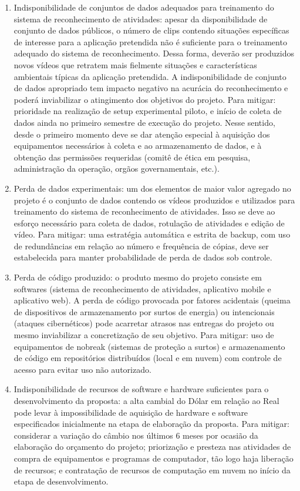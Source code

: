 \begin{enumerate}
	\item Indisponibilidade de conjuntos de dados adequados para treinamento do sistema de reconhecimento de atividades: apesar da disponibilidade de conjunto de dados públicos, o número de clips contendo situações específicas de interesse para a aplicação pretendida não é suficiente para o treinamento adequado do sistema de reconhecimento. Dessa forma, deverão ser produzidos novos vídeos que retratem mais fielmente situações e características ambientais típicas da aplicação pretendida. A indisponibilidade de conjunto de dados apropriado tem impacto negativo na acurácia do reconhecimento e poderá inviabilizar o atingimento dos objetivos do projeto. Para mitigar: prioridade na realização de setup experimental piloto, e início de coleta de dados ainda no primeiro semestre de execução do projeto. Nesse sentido, desde o primeiro momento deve se dar atenção especial à aquisição dos equipamentos necessários à coleta e ao armazenamento de dados, e à obtenção das permissões requeridas (comitê de ética em pesquisa, administração da operação, orgãos governamentais, etc.).
	\item Perda de dados experimentais: um dos elementos de maior valor agregado no projeto é o conjunto de dados contendo os vídeos produzidos e utilizados para treinamento do sistema de reconhecimento de atividades. Isso se deve ao esforço necessário para coleta de dados, rotulação de atividades e edição de vídeo. Para mitigar: uma estratégia automática e estrita de backup, com uso de redundâncias em relação ao número e frequência de cópias, deve ser estabelecida para manter probabilidade de perda de dados sob controle.
	\item Perda de código produzido: o produto mesmo do projeto consiste em softwares (sistema de reconhecimento de atividades, aplicativo mobile e aplicativo web). A perda de código provocada por fatores acidentais (queima de dispositivos de armazenamento por surtos de energia) ou intencionais (ataques cibernéticos) pode acarretar atrasos nas entregas do projeto ou mesmo inviabilizar a concretização de seu objetivo. Para mitigar: uso de equipamentos de nobreak (sistemas de proteção a surtos) e armazenamento de código em repositórios distribuídos (local e em nuvem) com controle de acesso para evitar uso não autorizado.
	\item Indisponibilidade de recursos de software e hardware suficientes para o desenvolvimento da proposta: a alta cambial do Dólar em relação ao Real pode levar à impossibilidade de aquisição de hardware e software especificados inicialmente na etapa de elaboração da proposta. Para mitigar: considerar a variação do câmbio nos últimos 6 meses por ocasião da elaboração do orçamento do projeto; priorização e presteza nas atividades de compra de equipamentos e programas de computador, tão logo haja liberação de recursos; e contratação de recursos de computação em nuvem no início da etapa de desenvolvimento.

\end{enumerate}
